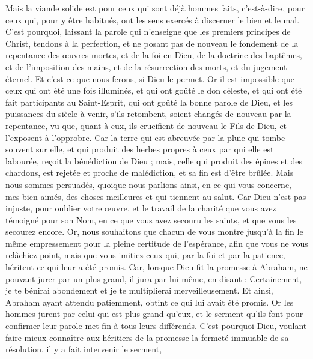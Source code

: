 \begin{multicols}{2}
Mais la viande solide est pour ceux qui sont déjà hommes faits, {c'est-à-dire }, pour ceux qui, pour y être habitués, ont les sens exercés à discerner le bien et le mal.
\VerseOne{}C'est pourquoi, laissant la parole qui n'enseigne que les premiers principes de Christ, tendons à la perfection, et ne posant pas de nouveau le fondement de la repentance des œuvres mortes, et de la foi en Dieu,
de la doctrine des baptêmes, et de l'imposition des mains, et de la résurrection des morts, et du jugement éternel.
Et c'est ce que nous ferons, si Dieu le permet.
Or il est impossible que ceux qui ont été une fois illuminés, et qui ont goûté le don céleste, et qui ont été fait participants au Saint-Esprit,
qui ont goûté la bonne parole de Dieu, et les puissances du siècle à venir,
s'ils retombent, soient changés de nouveau par la repentance, vu que, quant à eux, ils crucifient de nouveau le Fils de Dieu, et l'exposent à l'opprobre.
Car la terre qui est abreuvée par la pluie qui tombe souvent sur elle, et qui produit des herbes propres à ceux par qui elle est labourée, reçoit la bénédiction de Dieu ;
mais, celle qui produit des épines et des chardons, est rejetée et proche de malédiction, et sa fin est d'être brûlée.
Mais nous sommes persuadés, quoique nous parlions ainsi, en ce qui vous concerne, mes bien-aimés, des choses meilleures et qui tiennent au salut.
Car Dieu n'est pas injuste, pour oublier votre œuvre, et le travail de la charité que vous avez témoigné pour son Nom, en ce que vous avez secouru les saints, et que vous les secourez encore.
Or, nous souhaitons que chacun de vous montre jusqu'à la fin le même empressement pour la pleine certitude de l'espérance,
afin que vous ne vous relâchiez point, mais que vous imitiez ceux qui, par la foi et par la patience, héritent ce qui leur a été promis.
Car, lorsque Dieu fit la promesse à Abraham, ne pouvant jurer par un plus grand, il jura par lui-même,
en disant : Certainement, je te bénirai abondement et je te multiplierai merveilleusement.
Et ainsi, Abraham ayant attendu patiemment, obtint ce qui lui avait été promis.
Or les hommes jurent par celui qui est plus grand qu'eux, et le serment qu'ils font pour confirmer leur parole met fin à tous leurs différends.
C'est pourquoi Dieu, voulant faire mieux connaître aux héritiers de la promesse la fermeté immuable de sa résolution, il y a fait intervenir le serment,

\end{multicols}
